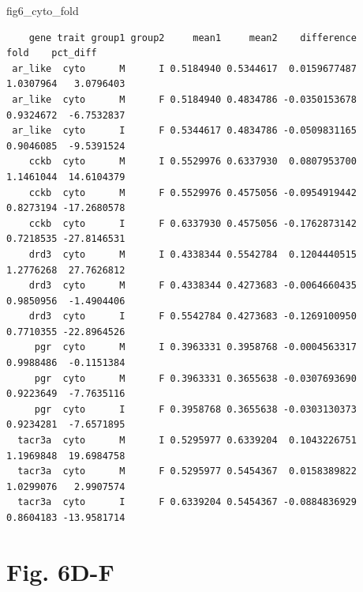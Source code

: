 \documentclass[
  landscape]{article}
\newenvironment{Shaded}{\begin{snugshade}}{\end{snugshade}}
\newcommand{\NormalTok}[1]{#1}
\begin{document}
\begin{Shaded}
\begin{Highlighting}[]
\NormalTok{fig6\_cyto\_fold}
\end{Highlighting}
\end{Shaded}

\begin{verbatim}
    gene trait group1 group2     mean1     mean2    difference      fold    pct_diff
 ar_like  cyto      M      I 0.5184940 0.5344617  0.0159677487 1.0307964   3.0796403
 ar_like  cyto      M      F 0.5184940 0.4834786 -0.0350153678 0.9324672  -6.7532837
 ar_like  cyto      I      F 0.5344617 0.4834786 -0.0509831165 0.9046085  -9.5391524
    cckb  cyto      M      I 0.5529976 0.6337930  0.0807953700 1.1461044  14.6104379
    cckb  cyto      M      F 0.5529976 0.4575056 -0.0954919442 0.8273194 -17.2680578
    cckb  cyto      I      F 0.6337930 0.4575056 -0.1762873142 0.7218535 -27.8146531
    drd3  cyto      M      I 0.4338344 0.5542784  0.1204440515 1.2776268  27.7626812
    drd3  cyto      M      F 0.4338344 0.4273683 -0.0064660435 0.9850956  -1.4904406
    drd3  cyto      I      F 0.5542784 0.4273683 -0.1269100950 0.7710355 -22.8964526
     pgr  cyto      M      I 0.3963331 0.3958768 -0.0004563317 0.9988486  -0.1151384
     pgr  cyto      M      F 0.3963331 0.3655638 -0.0307693690 0.9223649  -7.7635116
     pgr  cyto      I      F 0.3958768 0.3655638 -0.0303130373 0.9234281  -7.6571895
  tacr3a  cyto      M      I 0.5295977 0.6339204  0.1043226751 1.1969848  19.6984758
  tacr3a  cyto      M      F 0.5295977 0.5454367  0.0158389822 1.0299076   2.9907574
  tacr3a  cyto      I      F 0.6339204 0.5454367 -0.0884836929 0.8604183 -13.9581714
\end{verbatim}

\section{Fig. 6D-F}\label{fig.-6d-f}
\end{document}
